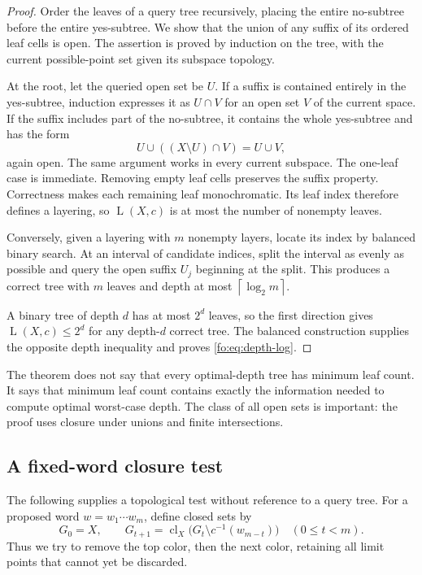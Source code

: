 \documentclass[11pt,letterpaper]{article}
\numberwithin{equation}{section}
\theoremstyle{definition}
\theoremstyle{remark}
\theoremstyle{definition}
\newcommand{\cl}{\operatorname{cl}}
\newcommand{\ceil}[1]{\left\lceil#1\right\rceil}
\newcommand{\layers}{\operatorname{L}}
\begin{document}
\begin{proof}
Order the leaves of a query tree recursively, placing the entire no-subtree
before the entire yes-subtree. We show that the union of any suffix of its
ordered leaf cells is open. The assertion is proved by induction on the tree,
with the current possible-point set given its subspace topology.

At the root, let the queried open set be $U$. If a suffix is contained entirely
in the yes-subtree, induction expresses it as $U\cap V$ for an open set $V$ of
the current space. If the suffix includes part of the no-subtree, it contains
the whole yes-subtree and has the form
\[
 U\cup((X\setminus U)\cap V)=U\cup V,
\]
again open. The same argument works in every current subspace. The one-leaf
case is immediate. Removing empty leaf cells preserves the suffix property.
Correctness makes each remaining leaf monochromatic. Its leaf index therefore
defines a layering, so $\layers(X,c)$ is at most the number of nonempty leaves.

Conversely, given a layering with $m$ nonempty layers, locate its index by
balanced binary search. At an interval of candidate indices, split the interval
as evenly as possible and query the open suffix $U_j$ beginning at the split.
This produces a correct tree with $m$ leaves and depth at most
$\ceil{\log_2m}$.

A binary tree of depth $d$ has at most $2^d$ leaves, so the first direction gives
$\layers(X,c)\le2^d$ for any depth-$d$ correct tree. The balanced construction
supplies the opposite depth inequality and proves \eqref{fo:eq:depth-log}.
\end{proof}

The theorem does not say that every optimal-depth tree has minimum leaf count.
It says that minimum leaf count contains exactly the information needed to
compute optimal worst-case depth. The class of all open sets is important:
the proof uses closure under unions and finite intersections.

\subsection{A fixed-word closure test}

The following supplies a topological test without reference to a query tree.
For a proposed word $w=w_1\cdots w_m$, define closed sets by
\begin{equation}\label{fo:eq:closure}
 G_0=X,\qquad
 G_{t+1}=\cl_X\bigl(G_t\setminus c^{-1}(w_{m-t})\bigr)
 \quad(0\le t<m).
\end{equation}
Thus we try to remove the top color, then the next color, retaining all limit
points that cannot yet be discarded.
\end{document}
